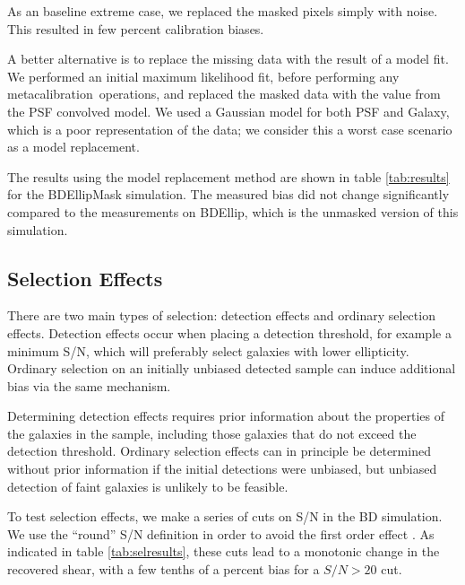 \documentclass[usegraphicx,usenatbib]{mn2e}
\newcommand{\mcal}{metacalibration}
\begin{document}
As an baseline extreme case, we replaced the masked pixels simply with noise.
This resulted in few percent calibration biases.

A better alternative is to replace the missing data with the result of a model
fit.  We performed an initial maximum likelihood fit, before performing any
\mcal\ operations, and replaced the masked data with the value from the PSF
convolved model.  We used a Gaussian model for both PSF and Galaxy, which is a
poor representation of the data; we consider this a worst case scenario as a
model replacement. 

The results using the model replacement method are shown in table
\ref{tab:results} for the BDEllipMask simulation.  The measured bias did not
change significantly compared to the measurements on BDEllip, which is the
unmasked version of this simulation.


\subsection{Selection Effects} \label{sec:selection}

There are two main types of selection: detection effects and ordinary selection
effects.  Detection effects occur when placing a detection threshold, for
example a minimum S/N, which will preferably select galaxies with lower
ellipticity.  Ordinary selection on an initially unbiased detected sample can
induce additional bias via the same mechanism.

Determining detection effects requires prior information about the properties of
the galaxies in the sample, including those galaxies that do not exceed the detection
threshold.  Ordinary selection effects can in principle be determined without
prior information if the initial detections were unbiased, but unbiased
detection of faint galaxies is unlikely to be feasible.

To test selection effects, we make a series of cuts on S/N in the BD
simulation.  We use the ``round'' S/N definition in order to avoid the first
order effect \citep{DESSVShear}. As indicated in table \ref{tab:selresults},
these cuts lead to a monotonic change in the recovered shear, with a few
tenths of a percent bias for a $S/N > 20$ cut.
\end{document}
